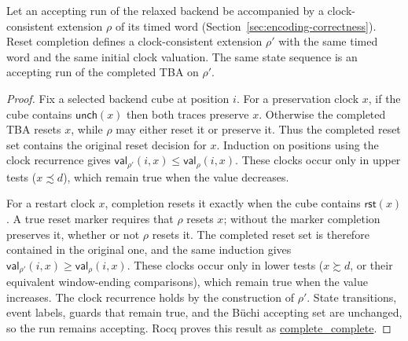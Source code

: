 \documentclass[manuscript]{acmart}
\providecommand{\Reset}{}\renewcommand{\Reset}{\mathsf{rst}}
\newcommand{\Unch}{\mathsf{unch}}
\newcommand{\CVal}{\mathsf{val}}
\newcommand{\Rocqid}[1]{\url{#1}}
\begin{document}
\begin{lemma}
\label{lem:reset-completion}
Let an accepting run of the relaxed backend be accompanied by a
clock-consistent extension $\rho$ of its timed word
(Section~\ref{sec:encoding-correctness}). Reset completion
defines a clock-consistent extension $\rho'$ with the same timed word and
the same initial clock valuation. The same state sequence is an accepting
run of the completed TBA on $\rho'$.
\end{lemma}
\begin{proof}
Fix a selected backend cube at position $i$. For a preservation clock $x$,
if the cube contains $\Unch(x)$ then both traces preserve $x$. Otherwise the
completed TBA resets $x$, while $\rho$ may either reset it or preserve it.
Thus the completed reset set contains the original reset decision for $x$.
Induction on positions using the clock recurrence gives
$\CVal_{\rho'}(i,x)\le\CVal_\rho(i,x)$. These clocks occur only in upper
tests ($x\precsim d$), which remain true when the value decreases.

For a restart clock $x$, completion resets it exactly when the cube contains
$\Reset(x)$. A true reset marker requires that $\rho$ resets $x$; without the
marker completion preserves it, whether or not $\rho$ resets it. The
completed reset set is therefore contained in the original one, and the same
induction gives $\CVal_{\rho'}(i,x)\ge\CVal_\rho(i,x)$. These clocks occur
only in lower tests ($x\succsim d$, or their equivalent window-ending
comparisons), which remain true when the value increases. The clock recurrence
holds by the construction of $\rho'$. State transitions, event labels,
guards that remain true, and the B\"uchi accepting set are unchanged, so the
run remains accepting. Rocq proves this result as
\Rocqid{complete_complete}.
\end{proof}


\end{document}
